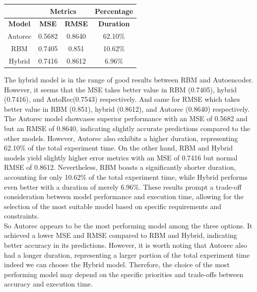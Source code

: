 \documentclass{cup-pan}
\begin{document}
\begin{center} 

  \begin{tabular}{||c||c|c|c||}
    \hline\hline
    \textbf{} & \multicolumn{2}{c||}{\textbf{Metrics}} & \multicolumn{1}{c||}{\textbf{Percentage}} \\
    \hline\hline
    \multicolumn{1}{||c||}{\textbf{Model}} & \textbf{MSE} & \textbf{RMSE} & \textbf{Duration} \\
    \hline
    Autorec & 0.5682 & 0.8640 & 62.10\% \\
    RBM & 0.7405 & 0.851 & 10.62\% \\
    Hybrid & 0.7416 & 0.8612 & 6.96\% \\
    \hline\hline
  \end{tabular}
\end{center}
The hybrid model is in the range of good results between RBM and Autoencoder. However, it seems that the MSE takes better value in  RBM (0.7405), hybrid (0.7416), and AutoRec(0.7543) respectively. And same for RMSE which takes better value in RBM (0.851), hybrid (0.8612), and Autorec (0.8640) respectively.
\\
The Autorec model showcases superior performance with an MSE of 0.5682 and but an RMSE of 0.8640, indicating slightly accurate predictions compared to the other models. However, Autorec also exhibits a higher duration, representing 62.10\% of the total experiment time. On the other hand, RBM and Hybrid models yield slightly higher error metrics with an MSE of 0.7416 but normal RMSE of 0.8612. Nevertheless, RBM boasts a significantly shorter duration, accounting for only 10.62\% of the total experiment time, while Hybrid performs even better with a duration of merely 6.96\%. These results prompt a trade-off consideration between model performance and execution time, allowing for the selection of the most suitable model based on specific requirements and constraints.
\\
So Autorec appears to be the most performing model among the three options. It achieved a lower MSE and RMSE compared to RBM and Hybrid, indicating better accuracy in its predictions. However, it is worth noting that Autorec also had a longer duration, representing a larger portion of the total experiment time indeed we can choose the Hybrid model. Therefore, the choice of the most performing model may depend on the specific priorities and trade-offs between accuracy and execution time.
\end{document}
